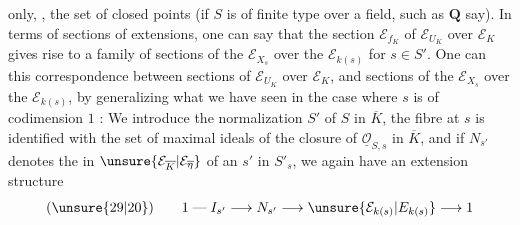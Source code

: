  only, , the set of closed points (if $S$ is of finite type over a field, such as $\mathbf Q$ say). In terms of sections of extensions, one can say that the section $\mathcal E_{f_K}$ of $\mathcal E_{U_K}$ over $\mathcal E_K$ gives rise to a family of sections of the $\mathcal E_{X_s}$ over the $\mathcal E_{k(s)}$ for $s\in S'$. One can    this correspondence between sections of $\mathcal E_{U_K}$ over $\mathcal E_K$, and sections of the $\mathcal E_{X_s}$ over the $\mathcal E_{k(s)}$, by generalizing what we have seen in the case where $s$ is of codimension $1$ : We introduce the normalization $S'$ of $S$ in $\overline K$, the fibre at $s$ is identified with the set of maximal ideals of the  closure of $\underline{\mathcal O}_{S,s}$ in $\overline K$, and if $N_{s'}$ denotes the   in $\unsure{\mathcal E_{\overline K}|\mathcal E_{\overline\eta}}$ of an $s'$ in $S'_s$, we again have an extension structure
\[
(\unsure{29|20})\qquad
1\mathrel{\text{---}}I_{s'}\longrightarrow N_{s'}\longrightarrow \unsure{\mathcal E_{k(s)}|E_{k(s)}}\longrightarrow 1
\]
